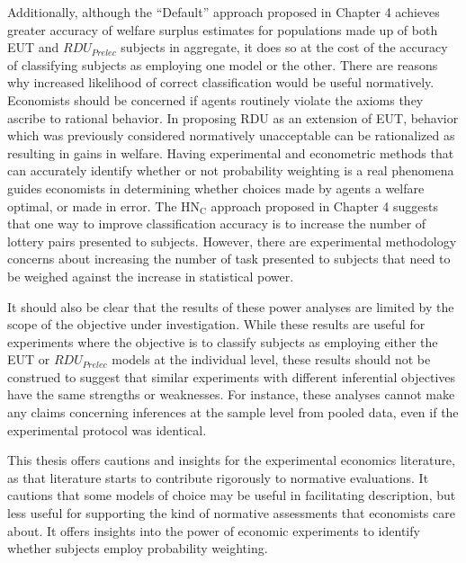 \documentclass[../main.tex]{subfiles}
\begin{document}
Additionally, although the \enquote{Default} approach proposed in Chapter 4 achieves greater accuracy of welfare surplus estimates for populations made up of both EUT and $\mathit{RDU_{Prelec}}$ subjects in aggregate, it does so at the cost of the accuracy of classifying subjects as employing one model or the other.
There are reasons why increased likelihood of correct classification would be useful normatively.
Economists should be concerned if agents routinely violate the axioms they ascribe to rational behavior.
In proposing RDU as an extension of EUT, behavior which was previously considered normatively unacceptable can be rationalized as resulting in gains in welfare.
Having experimental and econometric methods that can accurately identify whether or not probability weighting is a real phenomena guides economists in determining whether choices made by agents a welfare optimal, or made in error.
The $\text{HN}_\text{C}$ approach proposed in Chapter 4 suggests that one way to improve classification accuracy is to increase the number of lottery pairs presented to subjects.
However, there are experimental methodology concerns about increasing the number of task presented to subjects that need to be weighed against the increase in statistical power.

It should also be clear that the results of these power analyses are limited by the scope of the objective under investigation.
While these results are useful for experiments where the objective is to classify subjects as employing either the EUT or $\mathit{RDU_{Prelec}}$ models at the individual level, these results should not be construed to suggest that similar experiments with different inferential objectives have the same strengths or weaknesses.
For instance, these analyses cannot make any claims concerning inferences at the sample level from pooled data, even if the experimental protocol was identical.

This thesis offers cautions and insights for the experimental economics literature, as that literature starts to contribute rigorously to normative evaluations.
It cautions that some models of choice may be useful in facilitating description, but less useful for supporting the kind of normative assessments that economists care about.
It offers insights into the power of economic experiments to identify whether subjects employ probability weighting.

\onlyinsubfile{
\newpage
\printbibliography[segment=5, heading=subbibliography]
}
\end{document}
